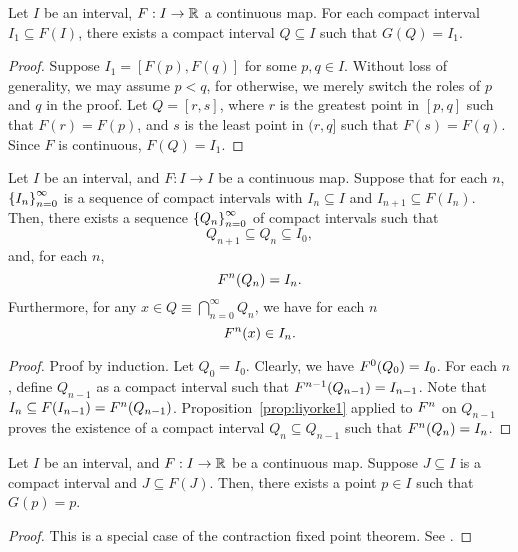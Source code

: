 \documentclass[10pt,draft,twoside]{book}
\begin{document}
\begin{proposition}
  Let $I$ be an interval, $F: I \to \mathbb{R}$ a continuous map.
  For each compact interval $I_1 \subseteq F(I)$, there exists a compact interval $Q \subseteq I$ such that $G(Q) = I_1$.
  \label{prop:liyorke1}
  \begin{proof}
    Suppose $I_1 = [F(p),F(q)]$ for some $p,q \in I$.
    Without loss of generality, we may assume $p < q$, for otherwise, we merely switch the roles of $p$ and $q$ in the proof.
    Let $Q = [r,s]$, where $r$ is the greatest point in $[p,q]$ such that $F(r) = F(p)$, and $s$ is the least point in $(r,q]$ such that $F(s) = F(q)$.
    Since $F$ is continuous, $F(Q) = I_1$.
  \end{proof}
\end{proposition}
\begin{proposition}
  Let $I$ be an interval, and $F: I\to I$ be a continuous map.
  Suppose that for each $n$, $\left \{ I_n \right \}^{\infty}_{n=0}$ is a sequence of compact intervals with $I_n \subseteq I$ and $I_{n+1} \subseteq F(I_n)$.
  Then, there exists a sequence $\left \{ Q_n \right \}^{\infty}_{n=0}$ of compact intervals such that 
\begin{equation*}
    Q_{n+1} \subseteq Q_{n} \subseteq I_0,
  \end{equation*}
and, for each $n$,
  \begin{equation*}
    F^{n}(Q_n) = I_n.
  \end{equation*}
  Furthermore, for any $x \in Q \equiv \bigcap\limits_{n=0}^{\infty}Q_n$, we have for each $n$
  \begin{equation*}
    F^{n}(x) \in I_n.
  \end{equation*}
  \label{prop:liyorke2}
  \begin{proof}
    Proof by induction.
    Let $Q_0 = I_0$.
    Clearly, we have $F^{0}(Q_0) = I_0$.
    For each $n$, define $Q_{n-1}$ as a compact interval such that $F^{n-1}(Q_{n-1}) = I_{n-1}$.
    Note that $I_n \subseteq F(I_{n-1}) = F^{n}(Q_{n-1})$.
    Proposition~\ref{prop:liyorke1} applied to $F^{n}$ on $Q_{n-1}$ proves the existence of a compact interval $Q_n \subseteq Q_{n-1}$ such that $F^{n}(Q_n) = I_n$.
  \end{proof}
\end{proposition}
\begin{proposition}
  Let $I$ be an interval, and $F: I\to \mathbb{R}$ be a continuous map.
  Suppose $J \subseteq I$ is a compact interval and $J \subseteq F(J)$. 
  Then, there exists a point $p \in I$ such that $G(p) = p$.
  \begin{proof}
    This is a special case of the contraction fixed point theorem.
    See \citet{sternberg}.
  \end{proof}
  \label{prop:liyorke3}
\end{proposition}
\end{document}
